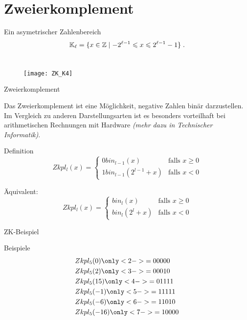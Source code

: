 \section{Zweierkomplement}

\begin{frame}{Ein asymetrischer Zahlenbereich}
	\[
	\mathbb{K}_{\ell} = \{ x\in \mathbb{Z}\mid -2^{\ell-1} \leqslant x \leqslant 2^{\ell-1} -1 \} \;.
	\]
	\\[0.2cm]
	
	\begin{figure}
		\centering
		\texttt{[image: ZK\_K4]}
	\end{figure}
	
\end{frame}

\begin{frame}{Zweierkomplement}

	Das Zweierkomplement ist eine Möglichkeit, negative Zahlen binär darzustellen. Im Vergleich zu anderen Darstellungsarten ist es besonders vorteilhaft bei arithmetischen Rechnungen mit Hardware \textit{(mehr dazu in Technischer Informatik)}.

	\begin{block}{Definition}
		$$Zkpl_l(x) = \begin{cases} 0 bin_{l-1}(x) & \text{falls } x \geq 0 \\ 1 bin_{l-1}(2^{l-1}+x) & \text{falls } x < 0\end{cases}$$
		
		Äquivalent:
		$$Zkpl_l(x) = \begin{cases} bin_{l}(x) & \text{falls } x \geq 0 \\ bin_{l}(2^{l}+x) & \text{falls } x < 0\end{cases}$$
	\end{block}
\end{frame}

\begin{frame}{ZK-Beispiel}
	\begin{block}{Beispiele}
		\begin{align*}
			&Zkpl_5(0) \only<2->{= 00000} \\
			&Zkpl_5(2) \only<3->{= 00010} \\
			&Zkpl_5(15) \only<4->{= 01111} \\
			&Zkpl_5(-1) \only<5->{= 11111} \\
			&Zkpl_5(-6) \only<6->{= 11010} \\
			&Zkpl_5(-16) \only<7->{= 10000}
		\end{align*}
	\end{block}
\end{frame}

